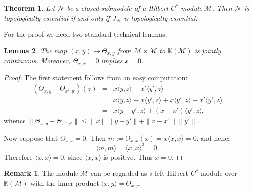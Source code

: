 \documentclass[reqno,a4paper,12pt]{amsart}
\theoremstyle{plain}
\newtheorem{theorem}{Theorem}[section]
\newtheorem{lemma}[theorem]{Lemma}
\theoremstyle{definition}
\newtheorem*{remark}{Remark}
\newcommand{\inner}[2]{\langle #1, #2 \rangle}
\newcommand{\KK}{\mathbb K}
\newcommand{\M}{\mathcal M}
\newcommand{\N}{\mathcal N}
\renewcommand{\leq}{\leqslant}
\begin{document}
	\begin{theorem}
		\label{thm:modules_ideals}
		Let $\N$ be a closed submodule of a Hilbert $C^*$-module $\M$.
		Then $\N$ is topologically essential if and only if $J_\N$ is topologically essential.
	\end{theorem}
	For the proof we need two standard technical lemmas.
	\begin{lemma}
		\label{lem:theta}
		The map $(x,y) \mapsto \Theta_{x,y}$ from $\M \times \M$ to $\KK(\M)$ is jointly continuous. Moreover, $\Theta_{x,x} = 0$ implies $x = 0$.
	\end{lemma}
	\begin{proof}
		The first statement follows from an easy computation:
		\begin{eqnarray*}
			(\Theta_{x,y} - \Theta_{x',y'})(z) &=& x\inner{y}{z} - x'\inner{y'}{z}  \\
			&=& x\inner{y}{z} - x\inner{y'}{z} + x\inner{y'}{z} - x'\inner{y'}{z}  \\
			&=& x\inner{y - y'}{z} + (x - x')\inner{y'}{z},
		\end{eqnarray*}
		whence $\|\Theta_{x,y} - \Theta_{x',y'}\|\leq \|x\|\|y-y'\| + \|x - x'\|\|y'\|$.
		
		Now suppose that $\Theta_{x,x} = 0$.
		Then $m := \Theta_{x,x}(x) = x\langle x,x \rangle = 0$, and hence
		\[
		\inner mm = \inner xx^3 = 0.
		\]
		Therefore $\inner{x}{x} = 0$, since $\inner{x}{x}$ is positive. Thus $x=0$.
	\end{proof}
	\begin{remark}
		The module $\M$ can be regarded as a left Hilbert $C^*$-module over $\KK(\M)$ with the inner product $\inner{x}{y} = \Theta_{x,y}$.
	\end{remark}
	
\end{document}

